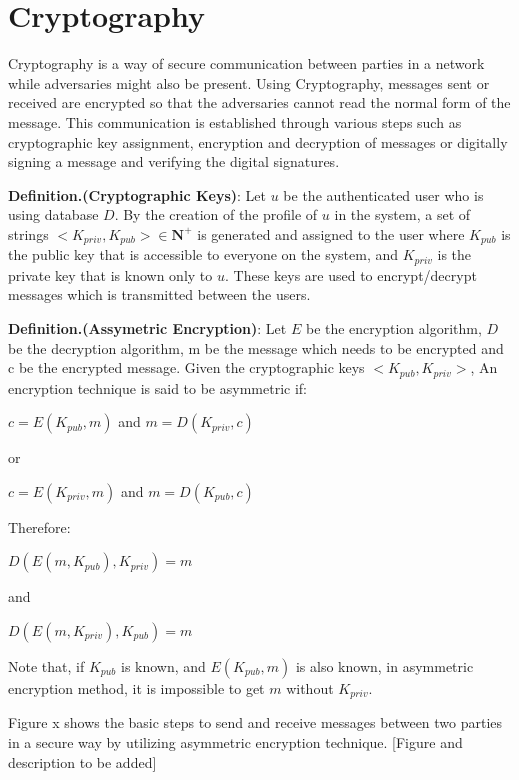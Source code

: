 
\section{Cryptography}
Cryptography is a way of secure communication between parties in a network while adversaries might also be present. Using Cryptography, messages sent or received are encrypted so that the adversaries cannot read the normal form of the message. This communication is established through various steps such as cryptographic key assignment, encryption and decryption of messages or digitally signing a message and verifying the digital signatures.


\textbf{Definition.(Cryptographic Keys)}: Let $u$ be the authenticated user who is using database $D$. By the creation of the profile of $u$ in the system, a set of strings $<K_{priv},K_{pub}> \in \mathbf{N}^+$ is generated and assigned to the user where $K_{pub}$ is the public key that is accessible to everyone on the system, and $K_{priv}$ is the private key that is known only to $u$. These keys are used to encrypt/decrypt messages which is transmitted between the users.


\textbf{Definition.(Assymetric Encryption)}: Let $E$ be the encryption algorithm, $D$ be the decryption algorithm, m be the message which needs to be encrypted and c be the encrypted message. Given the cryptographic keys $<K_{pub}, K_{priv}>$, An encryption technique is said to be asymmetric if:

\begin{center}
	$c = E(K_{pub},m)$ and  $m = D(K_{priv},c)$
\end{center}
or
\begin{center}
	$c = E(K_{priv},m)$ and  $m = D(K_{pub},c)$
\end{center}
Therefore:
\begin{center}
	$D(E(m,K_{pub}),K_{priv}) = m$ 
\end{center}
and
\begin{center}
	$D(E(m,K_{priv}),K_{pub}) = m$
\end{center}
Note that, if $K_{pub}$ is known, and $E(K_{pub},m)$ is also known, in asymmetric encryption method, it is impossible to get $m$ without $K_{priv}$.

Figure x shows the basic steps to send and receive messages between two parties in a secure way by utilizing asymmetric encryption technique. [Figure and description to be added]

